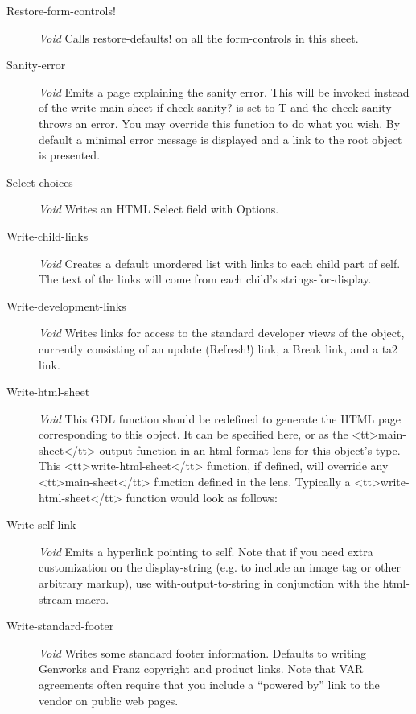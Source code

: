 \documentclass [11pt]{book}
\begin{document}
\begin{itemize}
\begin{description}
\item [Restore-form-controls!]
\emph{Void} Calls restore-defaults! on all the form-controls in this sheet.


\item [Sanity-error]
\emph{Void} Emits a page explaining the sanity error. This will be invoked instead of the write-main-sheet
if check-sanity? is set to T and the check-sanity throws an error. You may override this function to
do what you wish. By default a minimal error message is displayed and a link to the root object
is presented.


\item [Select-choices]
\emph{Void} Writes an HTML Select field with Options.


\item [Write-child-links]
\emph{Void} Creates a default unordered list with links to each child part of self.
The text of the links will come from each child's strings-for-display.


\item [Write-development-links]
\emph{Void} Writes links for access to the standard developer views of the object, currently consisting
of an update (Refresh!) link, a Break link, and a ta2 link.


\item [Write-html-sheet]
\emph{Void} This GDL function should be redefined to generate the HTML page corresponding to this object.
It can be specified here, or as the <tt>main-sheet</tt> output-function in an html-format lens for this
object's type. This <tt>write-html-sheet</tt> function, if defined,  will override any <tt>main-sheet</tt>
function defined in the lens. Typically a <tt>write-html-sheet</tt> function would look as follows:


\item [Write-self-link]
\emph{Void} Emits a hyperlink pointing to self. Note that if you need extra customization
on the display-string (e.g. to include an image tag or other arbitrary markup), use with-output-to-string
in conjunction with the html-stream macro.


\item [Write-standard-footer]
\emph{Void} Writes some standard footer information. Defaults to writing Genworks and Franz
copyright and product links. Note that VAR agreements often require that you include a ``powered by''
link to the vendor on public web pages.



\end{description}
\end{itemize}
\end{document}
